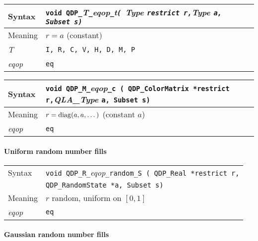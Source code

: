\documentclass{article}
\newcommand{\diag}{\mathop{\rm diag}}
\newcommand{\tReal}{QDP\ttdash Real }
\newcommand{\tColorMatrix}{QDP\ttdash ColorMatrix }
\newcommand{\tRandomState}{QDP\ttdash RandomState }
\newcommand{\namespace}{QDP}
\newcommand{\allNumericTypes}{{\tt I, R, C, V, H, D, M, P}}
\newcommand{\ttdash}{{\tt \_}}
\newcommand{\itt}{\it T}
\newcommand{\extraarg}{, Subset s}
\begin{document}
\begin{flushleft}
  \begin{tabular}{|l|l|}
  \hline
  Syntax      & {\tt void \namespace}\ttdash\itt\ttdash{\it eqop}\ttdash{\it t}{\tt ( }{\it Type }{\tt *restrict r,}{\it Type }{\tt *a\extraarg)} \\
  \hline
  Meaning     & $r = a$ (constant)\\
  \hline
  \itt        & \allNumericTypes \\
  \hline
  {\it eqop}  & {\tt eq} \\
  \hline
  \end{tabular}
\end{flushleft}

\begin{flushleft}
  \begin{tabular}{|l|l|}
  \hline
  Syntax      & {\tt void \namespace}\ttdash{\tt M}\ttdash{\it eqop}\ttdash{\tt c ( \tColorMatrix *restrict r,}{\it QLA\_Type }{\tt *a\extraarg)} \\
  \hline
  Meaning     & $r = \diag(a,a,\ldots{})$ (constant $a$)\\
  \hline
  {\it eqop}  & {\tt eq} \\
  \hline
  \end{tabular}
\end{flushleft}

\paragraph{Uniform random number fills}

\begin{flushleft}
  \begin{tabular}{|l|l|}
  \hline
  Syntax      & {\tt void \namespace}\ttdash{\tt R}\ttdash{\it eqop}\ttdash{\tt random}\ttdash{\tt S ( \tReal *restrict r,}\\
              & {\tt \tRandomState *a\extraarg )} \\
  \hline
  Meaning     & $r$ random, uniform on $[0,1]$ \\
  \hline
  {\it eqop}  & {\tt eq} \\
  \hline
  \end{tabular}
\end{flushleft}

\paragraph{Gaussian random number fills}
\end{document}
